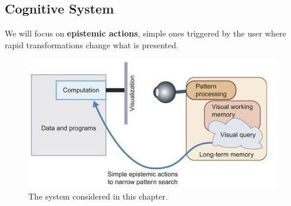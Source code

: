 \begin{mdframed}\begin{multicols}{2}
\subsection{Cognitive System}
We will focus on \textbf{epistemic actions}, simple ones triggered by the user
where rapid transformations change what is presented.

\begin{figure}[H] \centering
    \includegraphics[width=0.8\linewidth]{cognitive_system.png}
    \caption{The system considered in this chapter.}
\end{figure}




\end{multicols}
\end{mdframed}
